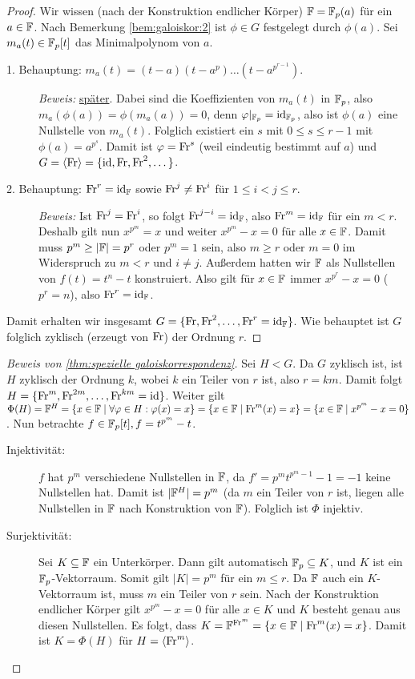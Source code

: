 \documentclass[12pt,a4paper]{scrartcl}
\begin{document}
\begin{proof}
	Wir wissen (nach der Konstruktion endlicher Körper) $\mathbb F = \mathbb F_p(a)$ für ein $a\in \mathbb F$. Nach Bemerkung \ref{bem:galoiskor:2} ist $\phi\in G$ festgelegt durch $\phi(a)$. Sei $m_a(t)\in\mathbb F_p[t]$ das Minimalpolynom von $a$.
	\begin{description}
		\item[1. Behauptung: $m_a(t) = (t-a)(t-a^p)\dots(t-a^{p^{r-1}})$.] \emph{Beweis:} \hyperref[thm:19.3]{später}. Dabei sind die Koeffizienten von $m_a(t)$ in $\mathbb F_p$, also $m_a(\phi(a)) = \phi(m_a(a)) = 0$, denn $\varphi|_{\mathbb F_p} = \operatorname{id}_{\mathbb F_p}$, also ist $\phi(a)$ eine Nullstelle von $m_a(t)$. Folglich existiert ein $s$ mit $0\leq s\leq r-1$ mit $\phi(a) = a^{p^s}$. Damit ist $\varphi = \operatorname{Fr}^s$ (weil eindeutig bestimmt auf $a$) und $G = \langle\operatorname{Fr}\rangle = \{\operatorname{id}, \operatorname{Fr}, \operatorname{Fr}^2,\dots\}$. \label{lem:19.2:1}
		\item[2. Behauptung: $\operatorname{Fr}^r = \operatorname{id}_{\mathbb F}$ sowie $\operatorname{Fr}^j\neq \operatorname{Fr}^i$ für $1\leq i<j\leq r$.] \emph{Beweis:} Ist $\operatorname{Fr}^j = \operatorname{Fr}^i$, so folgt $\operatorname{Fr}^{j-i} = \operatorname{id}_{\mathbb F}$, also $\operatorname{Fr}^m = \operatorname{id}_{\mathbb F}$ für ein $m<r$. Deshalb gilt nun $x^{p^m} = x$ und weiter $x^{p^m}-x = 0$ für alle $x\in\mathbb F$. Damit muss $p^m\geq|\mathbb F| = p^r$ oder $p^m = 1$ sein, also $m\geq r$ oder $m = 0$ im Widerspruch zu $m<r$ und $i\neq j$. Außerdem hatten wir $\mathbb F$ als Nullstellen von $f(t) = t^n-t$ konstruiert. Also gilt für $x\in \mathbb F$ immer $x^{p^r} -x = 0$ ($p^r = n$), also $\operatorname{Fr}^r = \operatorname{id}_{\mathbb F}$.
	\end{description}
	 Damit erhalten wir insgesamt $G = \{\operatorname{Fr}, \operatorname{Fr}^2,\dots, \operatorname{Fr}^r = \operatorname{id}_{\mathbb F}\}$. Wie behauptet ist $G$ folglich zyklisch (erzeugt von $\operatorname{Fr}$) der Ordnung $r$.
\end{proof}

\begin{proof}[Beweis von \cref{thm:spezielle galoiskorrespondenz}]
	Sei $H<G$. Da $G$ zyklisch ist, ist $H$ zyklisch der Ordnung $k$, wobei $k$ ein Teiler von $r$ ist, also $r = km$. Damit folgt $H = \{\operatorname{Fr}^m, \operatorname{Fr}^{2m},\dots, \operatorname{Fr}^{km} = \operatorname{id}\}$. Weiter gilt $\Phi(H) = \mathbb F^H = \{x\in\mathbb F\mid \forall\varphi\in H:\varphi(x) = x\} = \{x\in \mathbb F\mid\operatorname{Fr}^m(x) = x\} = \{x\in\mathbb F\mid x^{p^m}-x = 0\}$. Nun betrachte $f\in \mathbb F_p[t], f = t^{p^m}-t$.
	\begin{description}
		\item[Injektivität:] $f$ hat $p^m$ verschiedene Nullstellen in $\mathbb F$, da $f' = p^mt^{p^m-1}-1 = -1$ keine Nullstellen hat. Damit ist $|\mathbb F^H| = p^m$ (da $m$ ein Teiler von $r$ ist, liegen alle Nullstellen in $\mathbb F$ nach Konstruktion von $\mathbb F$). Folglich ist $\Phi$ injektiv.
		\item[Surjektivität:] Sei $K\subseteq \mathbb F$ ein Unterkörper. Dann gilt automatisch $\mathbb F_p\subseteq K$, und $K$ ist ein $\mathbb F_p$-Vektorraum. Somit gilt $|K| = p^m$ für ein $m\leq r$. Da $\mathbb F$ auch ein $K$-Vektorraum ist, muss $m$ ein Teiler von $r$ sein. Nach der Konstruktion endlicher Körper gilt $x^{p^m}-x = 0$ für alle $x\in K$ und $K$ besteht genau aus diesen Nullstellen. Es folgt, dass $K = \mathbb F^{\operatorname{Fr}^m} = \{x\in \mathbb F\mid\operatorname{Fr}^m(x) = x\}$. Damit ist $K = \Phi(H)$ für $H = \langle\operatorname{Fr}^m\rangle$.
		\qedhere
	\end{description}
\end{proof}
\end{document}
